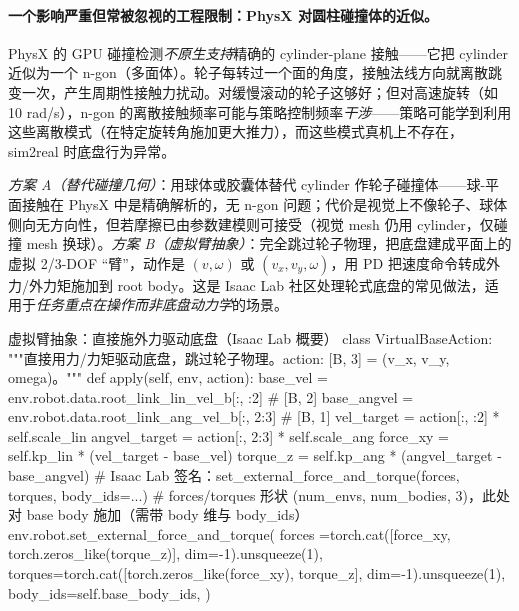 \paragraph{一个影响严重但常被忽视的工程限制：PhysX 对圆柱碰撞体的近似。}PhysX 的 GPU 碰撞检测\emph{不原生支持}精确的 cylinder-plane 接触——它把 cylinder 近似为一个 n-gon（多面体）。轮子每转过一个面的角度，接触法线方向就离散跳变一次，产生周期性接触力扰动。对缓慢滚动的轮子这够好；但对高速旋转（如 10 rad/s），n-gon 的离散接触频率可能与策略控制频率\emph{干涉}——策略可能学到利用这些离散模式（在特定旋转角施加更大推力），而这些模式真机上不存在，sim2real 时底盘行为异常。

\begin{insight}\label{ins:rlmc-wh-ngon}
\emph{方案 A（替代碰撞几何）}：用球体或胶囊体替代 cylinder 作轮子碰撞体——球-平面接触在 PhysX 中是精确解析的，无 n-gon 问题；代价是视觉上不像轮子、球体侧向无方向性，但若摩擦已由参数建模则可接受（视觉 mesh 仍用 cylinder，仅碰撞 mesh 换球）。\emph{方案 B（虚拟臂抽象）}：完全跳过轮子物理，把底盘建成平面上的虚拟 2/3-DOF “臂”，动作是 $(v,\omega)$ 或 $(v_x,v_y,\omega)$，用 PD 把速度命令转成外力/外力矩施加到 root body。这是 Isaac Lab 社区处理轮式底盘的常见做法，适用于\emph{任务重点在操作而非底盘动力学}的场景。
\end{insight}

\begin{codebox}[Python]{虚拟臂抽象：直接施外力驱动底盘（Isaac Lab 概要）}
class VirtualBaseAction:
    """直接用力/力矩驱动底盘，跳过轮子物理。action: [B, 3] = (v_x, v_y, omega)。"""
    def apply(self, env, action):
        base_vel    = env.robot.data.root_link_lin_vel_b[:, :2]   # [B, 2]
        base_angvel = env.robot.data.root_link_ang_vel_b[:, 2:3]  # [B, 1]
        vel_target    = action[:, :2]  * self.scale_lin
        angvel_target = action[:, 2:3] * self.scale_ang
        force_xy = self.kp_lin * (vel_target    - base_vel)
        torque_z = self.kp_ang * (angvel_target - base_angvel)
        # Isaac Lab 签名：set_external_force_and_torque(forces, torques, body_ids=...)
        # forces/torques 形状 (num_envs, num_bodies, 3)，此处对 base body 施加（需带 body 维与 body_ids）
        env.robot.set_external_force_and_torque(
            forces =torch.cat([force_xy, torch.zeros_like(torque_z)], dim=-1).unsqueeze(1),
            torques=torch.cat([torch.zeros_like(force_xy), torque_z], dim=-1).unsqueeze(1),
            body_ids=self.base_body_ids,
        )
\end{codebox}

